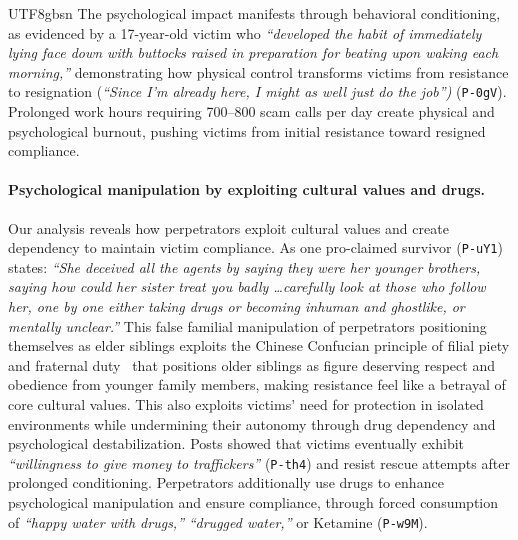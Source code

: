 \documentclass[sigconf,nonacm]{acmart}
\begin{document}
\begin{CJK}{UTF8}{gbsn}
The psychological impact manifests through behavioral conditioning, as evidenced by a 17-year-old victim who \textit{``developed the habit of immediately lying face down with buttocks raised in preparation for beating upon waking each morning,''} demonstrating how physical control transforms victims from resistance to resignation (\textit{``Since I'm already here, I might as well just do the job'')} (\texttt{P-0gV}). Prolonged work hours requiring 700--800 scam calls per day create physical and psychological burnout, pushing victims from initial resistance toward resigned compliance.

\paragraph{\textbf{Psychological manipulation by exploiting cultural values and drugs.}} Our analysis reveals how perpetrators exploit cultural values and create dependency to maintain victim compliance. As one pro-claimed survivor (\texttt{P-uY1}) states: \textit{``She deceived all the agents by saying they were her younger brothers, saying how could her sister treat you badly \dots carefully look at those who follow her, one by one either taking drugs or becoming inhuman and ghostlike, or mentally unclear.''} This false familial manipulation of perpetrators positioning themselves as elder siblings exploits the Chinese Confucian principle of filial piety and fraternal duty~\cite{pei2024confucian} that positions older siblings as figure deserving respect and obedience from younger family members, making resistance feel like a betrayal of core cultural values. This also exploits victims' need for protection in isolated environments while undermining their autonomy through drug dependency and psychological destabilization. Posts showed that victims eventually exhibit \textit{``willingness to give money to traffickers''} (\texttt{P-th4}) and resist rescue attempts after prolonged conditioning. Perpetrators additionally use drugs to enhance psychological manipulation and ensure compliance, through forced consumption of \textit{``happy water with drugs,''} \textit{``drugged water,''} or Ketamine (\texttt{P-w9M}).


\end{CJK}
\end{document}
